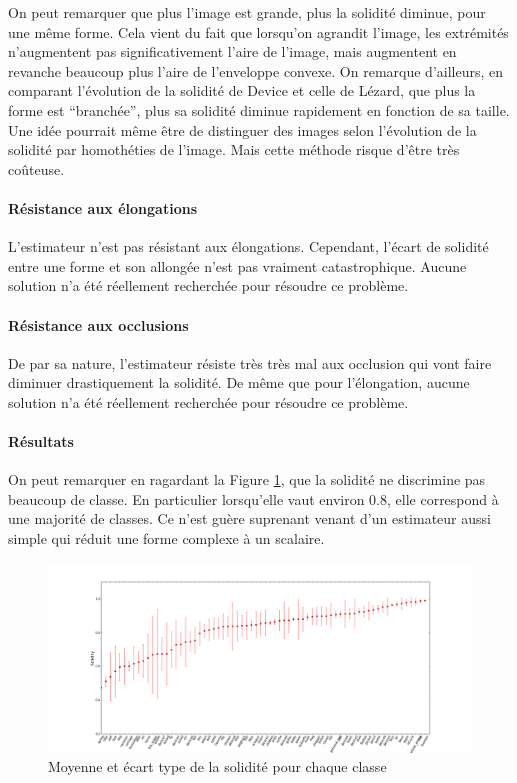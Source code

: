 \documentclass{article}
\theoremstyle{definition}
\begin{document}
	  On peut remarquer que plus l'image est grande, plus la solidité diminue, pour une même forme. Cela vient du fait que lorsqu'on agrandit l'image, les extrémités n'augmentent pas significativement l'aire de l'image, mais augmentent en revanche beaucoup plus l'aire de l'enveloppe convexe. On remarque d'ailleurs, en comparant l'évolution de la solidité de Device et celle de Lézard, que plus la forme est ``branchée'', plus sa solidité diminue rapidement en fonction de sa taille. Une idée pourrait même être de distinguer des images selon l'évolution de la solidité par homothéties de l'image. Mais cette méthode risque d'être très coûteuse.
	  
	\paragraph{Résistance aux élongations}
	
	  L'estimateur n'est pas résistant aux élongations. Cependant, l'écart de solidité entre une forme et son allongée n'est pas vraiment catastrophique. Aucune solution n'a été réellement recherchée pour résoudre ce problème.
	
	\paragraph{Résistance aux occlusions}
	  
	  De par sa nature, l'estimateur résiste très très mal aux occlusion qui vont faire diminuer drastiquement la solidité. De même que pour l'élongation, aucune solution n'a été réellement recherchée pour résoudre ce problème.
	  
	\paragraph{Résultats}

	  On peut remarquer en ragardant la Figure \ref{solidité-graph}, que la solidité ne discrimine pas beaucoup de classe. En particulier lorsqu'elle vaut environ 0.8, elle correspond à une majorité de classes. Ce n'est guère suprenant venant d'un estimateur aussi simple qui réduit une forme complexe à un scalaire. \\
	  
	  \begin{figure}[!h]
	    \begin{bigcenter}
	      \includegraphics[scale=0.38]{Graphes/solidite.png}
	    \end{bigcenter}
	    \caption{Moyenne et écart type de la solidité pour chaque classe}
	    \label{solidité-graph}
	  \end{figure}
	  
\end{document}
